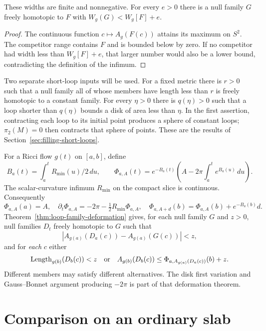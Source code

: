 \begin{proposition}
\label{prop:v4-width-properties}
These widths are finite and nonnegative. For every $e>0$ there is a null
family $G$ freely homotopic to $F$ with $W_g(G)<W_g[F]+e$.
\end{proposition}
\begin{proof}
The continuous function $c\mapsto A_g(F(c))$ attains its maximum on $S^2$.
The competitor range contains $F$ and is bounded below by zero. If no
competitor had width less than $W_g[F]+e$, that larger number would also
be a lower bound, contradicting the definition of the infimum.
\end{proof}

Two separate short-loop inputs will be used. For a fixed metric there is
$r>0$ such that a null family all of whose members have length less than
$r$ is freely homotopic to a constant family. For every $\eta>0$ there
is $q(\eta)>0$ such that a loop shorter than $q(\eta)$ bounds a disk of
area less than $\eta$. In the first assertion, contracting each loop to
its initial point produces a sphere of constant loops; $\pi_2(M)=0$
then contracts that sphere of points. These are the results of
Section~\ref{sec:filling-short-loops}.

For a Ricci flow $g(t)$ on $[a,b]$, define
\[
 B_a(t)=\int_a^t R_{\min}(u)/2\,du,\qquad
 \Phi_{a,A}(t)=e^{-B_a(t)}
       \left(A-2\pi\int_a^t e^{B_a(u)}\,du\right).
\]
The scalar-curvature infimum $R_{\min}$ on the compact slice is continuous.
Consequently
\[
 \Phi_{a,A}(a)=A,\quad
 \partial_t\Phi_{a,A}=-2\pi-\tfrac12R_{\min}\Phi_{a,A},\quad
 \Phi_{a,A+d}(b)=\Phi_{a,A}(b)+e^{-B_a(b)}d.
\]
Theorem~\ref{thm:loop-family-deformation} gives, for each null family $G$
and $z>0$, null families $D_t$ freely homotopic to $G$ such that
\[
 |A_{g(a)}(D_a(c))-A_{g(a)}(G(c))|<z,
\]
and for \emph{each} $c$ either
\[
 \operatorname{Length}_{g(b)}(D_b(c))<z
 \quad\hbox{or}\quad
 A_{g(b)}(D_b(c))\leq\Phi_{a,A_{g(a)}(D_a(c))}(b)+z.
\]
Different members may satisfy different alternatives. The disk first
variation and Gauss--Bonnet argument producing $-2\pi$ is part of that
deformation theorem.
\cite[Definition 18.23, Proposition 18.24 and Claim 18.26, pp. 433--434]{MT2007}

\section{Comparison on an ordinary slab}

